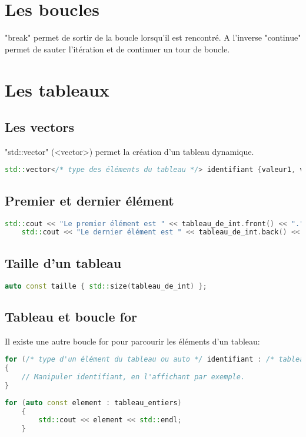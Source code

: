 \documentclass{article}
\begin{document}
\section{Les boucles}
"break" permet de sortir de la boucle lorsqu'il est rencontré. A l'inverse "continue" permet de sauter l'itération et de continuer un tour de boucle.

\section{Les tableaux}
\subsection{Les vectors}
"std::vector" (<vector>) permet la création d'un tableau dynamique.
\begin{lstlisting}[language = C++]
    std::vector</* type des éléments du tableau */> identifiant {valeur1, valeur2};
\end{lstlisting}{}

\subsection{Premier et dernier élément}
\begin{lstlisting}[language=C++]
    std::cout << "Le premier élément est " << tableau_de_int.front() << "." << std::endl;
    std::cout << "Le dernier élément est " << tableau_de_int.back() << "." << std::endl;
\end{lstlisting}{}

\subsection{Taille d'un tableau}
\begin{lstlisting}[language=c++]
auto const taille { std::size(tableau_de_int) };
\end{lstlisting}{}

\subsection{Tableau et boucle for}
Il existe une autre boucle for pour parcourir les éléments d'un tableau:
\begin{lstlisting}[language=C++]
for (/* type d'un élément du tableau ou auto */ identifiant : /* tableau à parcourir */)
{
    // Manipuler identifiant, en l'affichant par exemple.
}
\end{lstlisting}
\begin{lstlisting}[language=C++]
    for (auto const element : tableau_entiers)
    {
        std::cout << element << std::endl;
    }
\end{lstlisting}
\end{document}
